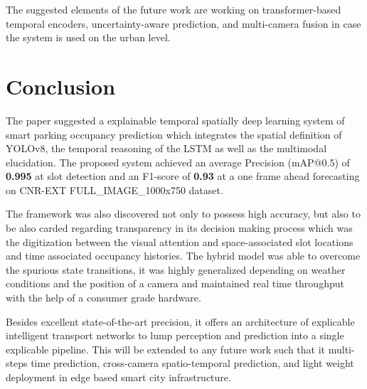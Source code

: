 \documentclass[conference]{IEEEtran}
\begin{document}
The suggested elements of the future work are working on transformer-based temporal encoders, uncertainty-aware prediction, and multi-camera fusion in case the system is used on the urban level.

\section{Conclusion}
The paper suggested a explainable temporal spatially deep learning system of smart parking occupancy prediction which integrates the spatial definition of YOLOv8, the temporal reasoning of the LSTM as well as the multimodal elucidation. The proposed system achieved an average Precision (mAP@0.5) of \textbf{0.995} at slot detection and an F1-score of \textbf{0.93} at a one frame ahead forecasting on CNR-EXT FULL\_IMAGE\_1000x750 dataset.

The framework was also discovered not only to possess high accuracy, but also to be also carded regarding transparency in its decision making process which was the digitization between the visual attention and space-associated slot locations and time associated occupancy histories. The hybrid model was able to overcome the spurious state transitions, it was highly generalized depending on weather conditions and the position of a camera and maintained real time throughput with the help of a consumer grade hardware.

Besides excellent state-of-the-art precision, it offers an architecture of explicable intelligent transport networks to lump perception and prediction into a single explicable pipeline. This will be extended to any future work such that it multi-steps time prediction, cross-camera spatio-temporal prediction, and light weight deployment in edge based smart city infrastructure.
\end{document}
